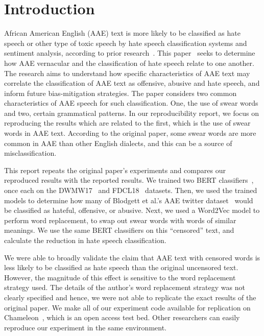 \section{Introduction}
African American English (AAE) text is more likely to be classified as hate speech or other type of toxic speech by hate speech classification systems and sentiment analysis, according to prior research~\cite{davidson, examining_race_bias, mitigating_racial_bias, risk_racial_bias}. This paper~\cite{aae_paper} seeks to determine how AAE vernacular and the classification of hate speech relate to one another. The research aims to understand how specific characteristics of AAE text may correlate the classification of AAE text as offensive, abusive and hate speech, and inform future bias-mitigation strategies. The paper considers two common characteristics of AAE speech for such classification. One, the use of swear words and two, certain grammatical patterns. In our reproducibility report, we focus on reproducing the results which are related to the first, which is the use of swear words in AAE text. According to the original paper, some swear words are more common in AAE than other English dialects, and this can be a source of misclassification.

This report repeats the original paper’s experiments and compares our reproduced results with the reported results. We trained two BERT classifiers~\cite{bert}, once each on the DWMW17~\cite{davidson} and FDCL18~\cite{founta} datasets. Then, we used the trained models to determine how many of Blodgett et al.’s AAE twitter dataset~\cite{blodgett} would be classified as hateful, offensive, or abusive. Next, we used a Word2Vec model to perform word replacement, to swap out swear words with words of similar meanings. We use the same BERT classifiers on this ``censored'' text, and calculate the reduction in hate speech classification. 

We were able to broadly validate the claim that AAE text with censored words is less likely to be classified as hate speech than the original uncensored text. However, the magnitude of this effect is sensitive to the word replacement strategy used. The details of the author's word replacement strategy was not clearly specified and hence, we were not able to replicate the exact results of the original paper. We make all of our experiment code available for replication on Chameleon~\cite{chameleon}, which is an open access test bed. Other researchers can easily reproduce our experiment in the same environment. 


